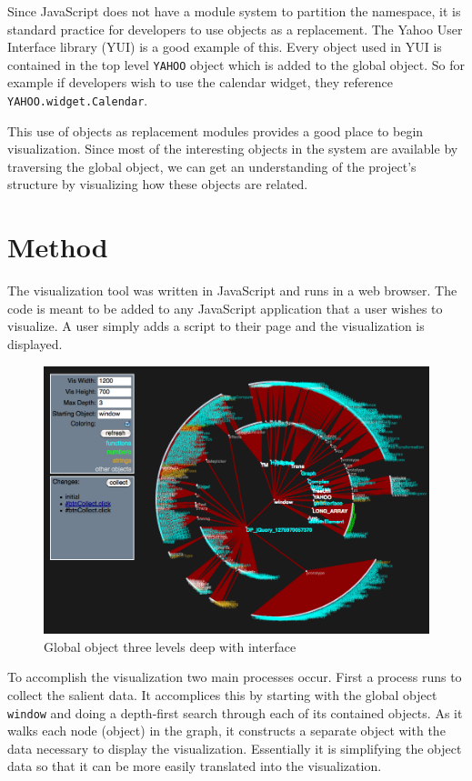 \documentclass[]{article}
\begin{document}
Since JavaScript does not have a module system to partition the namespace, it is standard practice for developers to use objects as a replacement. The Yahoo User Interface library (YUI) \cite{yui} is a good example of this. Every object used in YUI is contained in the top level {\tt YAHOO} object which is added to the global object. So for example if developers wish to use the calendar widget, they reference {\tt YAHOO.widget.Calendar}.

This use of objects as replacement modules provides a good place to begin visualization. Since most of the interesting objects in the system are available by traversing the global object, we can get an understanding of the project's structure by visualizing how these objects are related.

\section{Method}
\label{sec:method}
The visualization tool was written in JavaScript and runs in a web browser. The code is meant to be added to any JavaScript application that a user wishes to visualize. A user simply adds a script to their page and the visualization is displayed.


\begin{figure}[h]
  \begin{center}
    \includegraphics[scale=.35]{interface.png}
  \end{center}
  \caption{Global object three levels deep with interface}
  \label{fig:interface}
\end{figure}

To accomplish the visualization two main processes occur. First a process runs to collect the salient data. It accomplices this by starting with the global object {\tt window} and doing a depth-first search through each of its contained objects. As it walks each node (object) in the graph, it constructs a separate object with the data necessary to display the visualization. Essentially it is simplifying the object data so that it can be more easily translated into the visualization.
\end{document}
